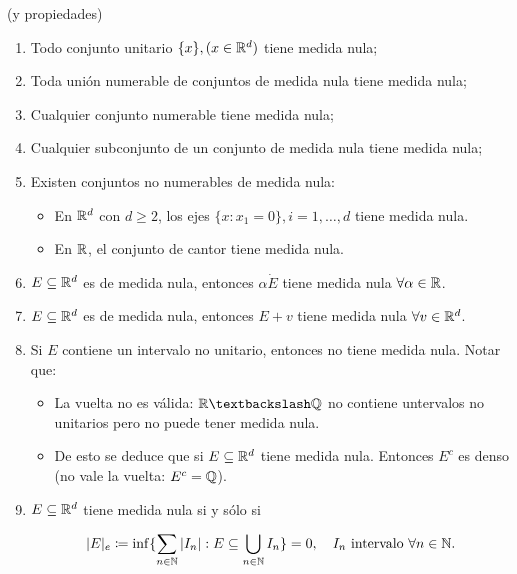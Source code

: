 \begin{eg}
	(y propiedades)
	\begin{enumerate}
		\item Todo conjunto unitario $\{x\}, (x\in\mathbb{R}^d)$ tiene medida nula;

		\item Toda unión numerable de conjuntos de medida nula tiene medida nula;

		\item Cualquier conjunto numerable tiene medida nula;
		
		\item Cualquier subconjunto de un conjunto de medida nula tiene medida nula;

		\item Existen conjuntos no numerables de medida nula:

		\begin{itemize}
			\item En $\mathbb{R}^d$ con $d\geq 2$, los ejes $\{x:x_1=0\}, i=1,\dots,d$ tiene medida nula.

			\item En $\mathbb{R}$, el conjunto de cantor tiene medida nula.
		\end{itemize}

		\item $E\subseteq\mathbb{R}^d$ es de medida nula, entonces $\alpha\dot E$ tiene medida nula $\forall\alpha\in\mathbb{R}$.
		
		\item $E\subseteq\mathbb{R}^d$ es de medida nula, entonces $E + v$ tiene medida nula $\forall v\in\mathbb{R}^d$.

		\item Si $E$ contiene un intervalo no unitario, entonces no tiene medida nula. Notar que:

		\begin{itemize}
			\item La vuelta no es válida: $\R\textbackslash\Q$ no contiene untervalos no unitarios pero no puede tener medida nula.

			\item De esto se deduce que si $E\subseteq\mathbb{R}^d$ tiene medida nula. Entonces $E^c$ es denso (no vale la vuelta: $E^c=\mathbb{Q}$).
		\end{itemize}

		\item $E\subseteq\mathbb{R}^d$ tiene medida nula si y sólo si

		\[
		|E|_e\coloneq\inf \{ \sum_{n\in\mathbb{N}} |I_n| : E \subseteq \bigcup_{n\in\mathbb{N}} I_n \} = 0, \quad I_n \text{ intervalo } \forall n \in \mathbb{N}.
		\]
	\end{enumerate}
\end{eg}
